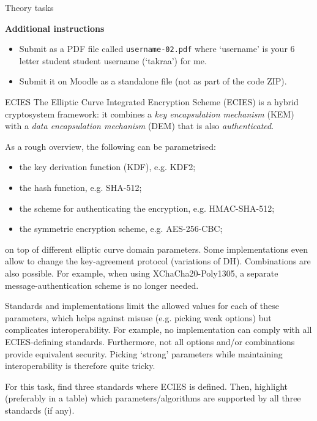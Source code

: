 \documentclass{homework}
\begin{document}
\newpage

\begin{center}
  Theory tasks
\end{center}

\textbf{Additional instructions}

\begin{itemize}
  \item Submit as a PDF file called \texttt{username-02.pdf} where `username' is your 6 letter student student username (`takraa') for me.
  \item Submit it on Moodle as a standalone file (not as part of the code ZIP).
\end{itemize}

\begin{task}{ECIES}
  The Elliptic Curve Integrated Encryption Scheme (ECIES) is a hybrid cryptosystem framework: it combines a \emph{key encapsulation mechanism} (KEM) with a \emph{data encapsulation mechanism} (DEM) that is also \emph{authenticated}.

  As a rough overview, the following can be parametrised:
  \begin{itemize}
    \item the key derivation function (KDF), e.g. KDF2;
    \item the hash function, e.g. SHA-512;
    \item the scheme for authenticating the encryption, e.g. HMAC-SHA-512;
    \item the symmetric encryption scheme, e.g. AES-256-CBC;
  \end{itemize}
  on top of different elliptic curve domain parameters.
  Some implementations even allow to change the key-agreement protocol (variations of DH).
  Combinations are also possible.
  For example, when using XChaCha20-Poly1305, a separate message-authentication scheme is no longer needed.

  Standards and implementations limit the allowed values for each of these parameters, which helps against misuse (e.g. picking weak options) but complicates interoperability.
  For example, no implementation can comply with all ECIES-defining standards.
  Furthermore, not all options and/or combinations provide equivalent security.
  Picking `strong' parameters while maintaining interoperability is therefore quite tricky. 

  For this task, find three standards where ECIES is defined.
  Then, highlight (preferably in a table) which parameters/algorithms are supported by all three standards (if any).
\end{task}
\end{document}
